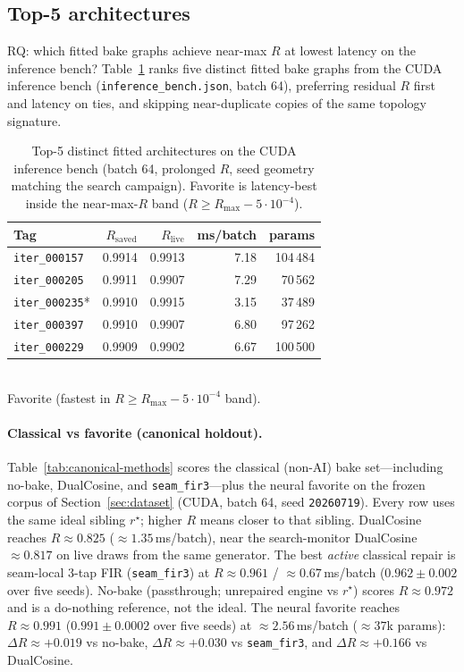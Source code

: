 \subsection{Top-5 architectures}
\label{sec:top5-arch}
RQ: which fitted bake graphs achieve near-max $R$ at lowest latency on the inference bench?
Table~\ref{tab:top5} ranks five distinct fitted bake graphs from the CUDA inference bench
(\texttt{inference\_bench.json}, batch 64), preferring residual $R$ first and latency on ties,
and skipping near-duplicate copies of the same topology signature.

\begin{table}[t]
  \centering
  \caption{Top-5 distinct fitted architectures on the CUDA inference bench (batch 64, prolonged $R$, seed geometry matching the search campaign). Favorite is latency-best inside the near-max-$R$ band ($R\ge R_{\max}-5\cdot10^{-4}$).}
  \label{tab:top5}
  \setlength{\tabcolsep}{3pt}
  \begin{tabular}{@{}lrrrr@{}}
    \toprule
    Tag & $R_{\mathrm{saved}}$ & $R_{\mathrm{live}}$ & ms/batch & params \\
    \midrule
    \texttt{iter\_000157} & 0.9914 & 0.9913 & 7.18 & 104\,484 \\
    \texttt{iter\_000205} & 0.9911 & 0.9907 & 7.29 & 70\,562 \\
    \texttt{iter\_000235}* & 0.9910 & 0.9915 & 3.15 & 37\,489 \\
    \texttt{iter\_000397} & 0.9910 & 0.9907 & 6.80 & 97\,262 \\
    \texttt{iter\_000229} & 0.9909 & 0.9902 & 6.67 & 100\,500 \\
    \bottomrule
  \end{tabular}\\[0.4em]
  {\footnotesize *Favorite (fastest in $R\ge R_{\max}-5\cdot10^{-4}$ band).}
\end{table}

\paragraph{Classical vs favorite (canonical holdout).}
Table~\ref{tab:canonical-methods} scores the classical (non-AI) bake set---including no-bake, DualCosine, and \texttt{seam\_fir3}---plus the neural favorite on the frozen corpus of Section~\ref{sec:dataset} (CUDA, batch 64, seed \texttt{20260719}).
Every row uses the same ideal sibling $r^{\star}$; higher $R$ means closer to that sibling.
DualCosine reaches $R\approx 0.825$ ($\approx 1.35$\,ms/batch), near the search-monitor DualCosine $\approx 0.817$ on live draws from the same generator.
The best \emph{active} classical repair is seam-local 3-tap FIR (\texttt{seam\_fir3}) at $R\approx 0.961$ / $\approx 0.67$\,ms/batch ($0.962\pm0.002$ over five seeds).
No-bake (passthrough; unrepaired engine vs $r^{\star}$) scores $R\approx 0.972$ and is a do-nothing reference, not the ideal.
The neural favorite reaches $R\approx 0.991$ ($0.991\pm0.0002$ over five seeds) at $\approx 2.56$\,ms/batch ($\approx 37$k params):
$\Delta R \approx {+}0.019$ vs no-bake, $\Delta R \approx {+}0.030$ vs \texttt{seam\_fir3}, and $\Delta R \approx {+}0.166$ vs DualCosine.

